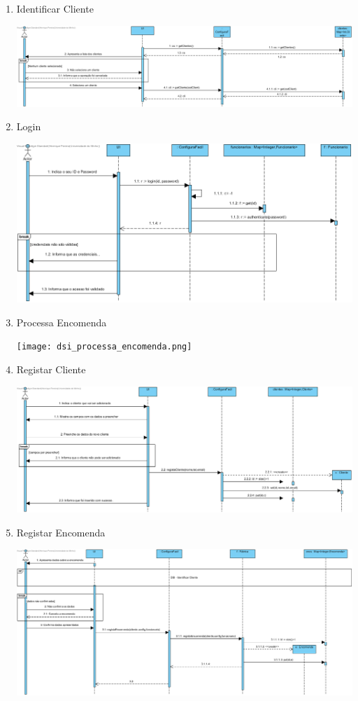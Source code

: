 \documentclass[11pt]{article} %
\begin{document}
\begin{enumerate}
\begin{center}
		\end{center}
	\item Identificar Cliente
		\begin{center}
 			\includegraphics[]{dsi_identificar_cliente.png}
		\end{center}
	\item Login
		\begin{center}
 			\includegraphics[]{dsi_login.png}
		\end{center}
	\item Processa Encomenda
		\begin{center}
 			\texttt{[image: dsi\_processa\_encomenda.png]}
		\end{center}
	\item Registar Cliente
		\begin{center}
 			\includegraphics[]{dsi_registar_cliente.png}
		\end{center}
	\item Registar Encomenda
		\begin{center}
 			\includegraphics[]{dsi_registar_encomenda.png}

\end{center}
\end{enumerate}
\end{document}
